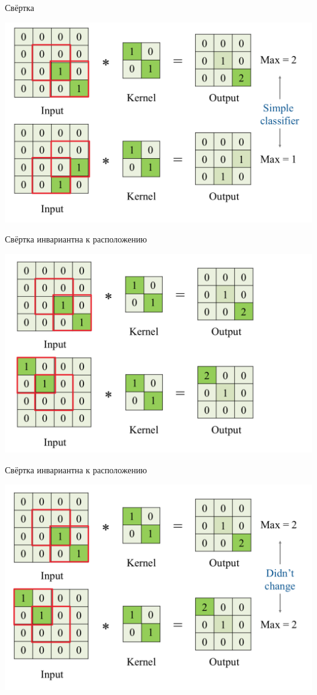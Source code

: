 \documentclass[notes,12pt, aspectratio=169]{beamer}
\begin{document}
\begin{frame}{Свёртка}
\begin{center}
	\includegraphics[width=.8\linewidth]{conv_2.png}
\end{center}
\end{frame}


\begin{frame}{Свёртка инвариантна к расположению}
\begin{center}
	\includegraphics[width=.8\linewidth]{conv_3.png}
\end{center}
\end{frame}


\begin{frame}{Свёртка инвариантна к расположению}
\begin{center}
	\includegraphics[width=.8\linewidth]{conv_4.png}
\end{center}
\end{frame}
\end{document}
